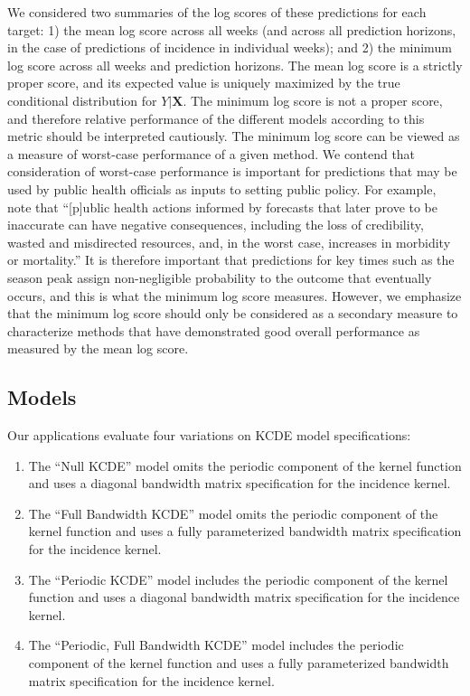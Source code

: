 \documentclass[times, doublespace]{simauth}\usepackage[]{graphicx}\usepackage[]{color}
\begin{document}
We considered two summaries of the log scores of these predictions for each target:
1) the mean log score across all weeks (and across all prediction horizons, in the case of
predictions of incidence in individual weeks); and 2) the minimum log score across
all weeks and prediction horizons.  The mean log score is a strictly proper score,
and its expected value is uniquely maximized by the true conditional distribution
for $Y | \mathbf{X}$.  The minimum log score is not a proper score, and therefore relative
performance of the different models according to this metric should be interpreted
cautiously.  The minimum log score can be viewed as a measure of worst-case
performance of a given method.  We contend that consideration of worst-case
performance is important for predictions that may be used by public
health officials as inputs to setting public policy.  For example,
\cite{biggerstaff2016resultsCDC20132014InfluenzaChallenge} note that
``[p]ublic health actions informed by forecasts that later prove to be inaccurate
can have negative consequences, including the loss of credibility, wasted and
misdirected resources, and, in the worst case, increases in morbidity or mortality.''
It is therefore important that predictions for key times such as the season
peak assign non-negligible probability to the outcome that eventually occurs,
and this is what the minimum log score measures.  However, we emphasize that the
minimum log score should only be considered as a secondary measure to characterize
methods that have demonstrated good overall performance as measured by the mean
log score.

\subsection{Models}

Our applications evaluate four variations on KCDE model specifications:
\begin{enumerate}
\item The ``Null KCDE'' model omits the periodic component of the kernel
function and uses a diagonal bandwidth matrix specification for the incidence
kernel.
\item The ``Full Bandwidth KCDE'' model omits the periodic component of the
kernel function and uses a fully parameterized bandwidth matrix specification for the incidence
kernel.
\item The ``Periodic KCDE'' model includes the periodic component of the kernel
function and uses a diagonal bandwidth matrix specification for the incidence
kernel.
\item The ``Periodic, Full Bandwidth KCDE'' model includes the periodic
component of the kernel function and uses a fully parameterized bandwidth
matrix specification for the incidence
kernel.
\end{enumerate}
\end{document}

